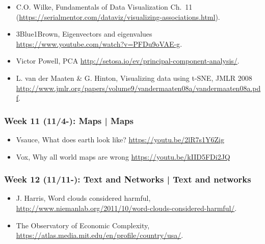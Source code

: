 \documentclass[11pt,article,oneside]{memoir} %
\begin{document}
\begin{itemize}\itemsep0em 
\item C.O. Wilke, Fundamentals of Data Visualization Ch.~11 (\url{https://serialmentor.com/dataviz/visualizing-associations.html}). 
\item 3Blue1Brown, Eigenvectors and eigenvalues \url{https://www.youtube.com/watch?v=PFDu9oVAE-g}. 
\item Victor Powell, PCA \url{http://setosa.io/ev/principal-component-analysis/}.
\item L. van der Maaten \& G. Hinton, Visualizing data using t-SNE, JMLR 2008 \url{http://www.jmlr.org/papers/volume9/vandermaaten08a/vandermaaten08a.pdf}.
\end{itemize}	

\subsubsection{Week 11 (11/4-): Maps | Maps }%

\begin{itemize}\itemsep0em 
\item Vsauce, What does earth look like? \url{https://youtu.be/2lR7s1Y6Zig}
\item Vox, Why all world maps are wrong \url{https://youtu.be/kIID5FDi2JQ}
\end{itemize}	
\subsubsection{Week 12 (11/11-): Text and Networks | Text and networks} %

\begin{itemize}\itemsep0em 
\item J. Harris, Word clouds considered harmful, \url{http://www.niemanlab.org/2011/10/word-clouds-considered-harmful/}. 
\item The Observatory of Economic Complexity, \url{https://atlas.media.mit.edu/en/profile/country/usa/}.
\end{itemize}	
\end{document}
